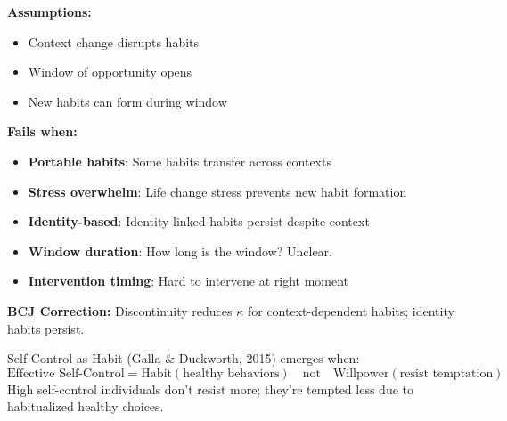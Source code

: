 \begin{tcolorbox}[colback=red!5!white, colframe=red!75!black, title=Boundary Condition: Where Habit Discontinuity Fails]
\textbf{Assumptions:}
\begin{itemize}[nosep]
\item Context change disrupts habits
\item Window of opportunity opens
\item New habits can form during window
\end{itemize}

\textbf{Fails when:}
\begin{itemize}[nosep]
\item \textbf{Portable habits}: Some habits transfer across contexts
\item \textbf{Stress overwhelm}: Life change stress prevents new habit formation
\item \textbf{Identity-based}: Identity-linked habits persist despite context
\item \textbf{Window duration}: How long is the window? Unclear.
\item \textbf{Intervention timing}: Hard to intervene at right moment
\end{itemize}

\textbf{BCJ Correction:} Discontinuity reduces $\kappa$ for context-dependent habits; identity habits persist.
\end{tcolorbox}


\begin{theorem}
\label{thm:selfcontrol-habit}
Self-Control as Habit (Galla \& Duckworth, 2015) emerges when:
\begin{equation}
\boxed{\text{Effective Self-Control} = \text{Habit}(\text{healthy behaviors}) \quad \text{not} \quad \text{Willpower}(\text{resist temptation})}
\end{equation}
High self-control individuals don't resist more; they're tempted less due to habitualized healthy choices.
\end{theorem}


